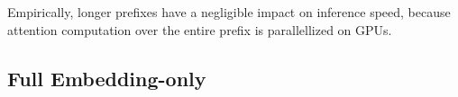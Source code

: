 \documentclass[11pt,a4paper]{article}
\newcommand\pl[1]{\textcolor{red}{[PL: #1]}}
\begin{document}

Empirically, longer prefixes have a negligible impact on inference speed, because attention computation over the entire prefix is parallellized on GPUs. %

\subsection{Full \@vs Embedding-only}
\label{ssec:embed_only}
\end{document}
